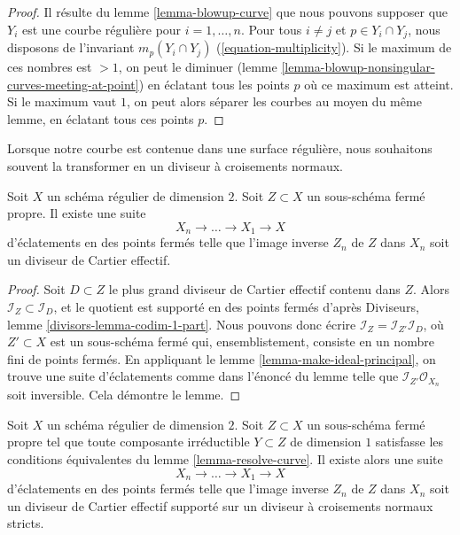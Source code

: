 \begin{proof} Il résulte du lemme \ref{lemma-blowup-curve} que nous pouvons supposer que $Y_i$ est une courbe régulière pour $i = 1, \ldots, n$. Pour tous $i \not = j$ et $p \in Y_i \cap Y_j$, nous disposons de l'invariant $m_p(Y_i \cap Y_j)$ (\ref{equation-multiplicity}). Si le maximum de ces nombres est $> 1$, on peut le diminuer (lemme \ref{lemma-blowup-nonsingular-curves-meeting-at-point}) en éclatant tous les points $p$ où ce maximum est atteint. Si le maximum vaut $1$, on peut alors séparer les courbes au moyen du même lemme, en éclatant tous ces points $p$. \end{proof}

\noindent Lorsque notre courbe est contenue dans une surface régulière, nous souhaitons souvent la transformer en un diviseur à croisements normaux.

\begin{lemma} \label{lemma-turn-into-effective-Cartier} Soit $X$ un schéma régulier de dimension $2$. Soit $Z \subset X$ un sous-schéma fermé propre. Il existe une suite $$
X_n \to \ldots \to X_1 \to X
$$ d'éclatements en des points fermés telle que l'image inverse $Z_n$ de $Z$ dans $X_n$ soit un diviseur de Cartier effectif. \end{lemma}

\begin{proof} Soit $D \subset Z$ le plus grand diviseur de Cartier effectif contenu dans $Z$. Alors $\mathcal{I}_Z \subset \mathcal{I}_D$, et le quotient est supporté en des points fermés d'après Diviseurs, lemme \ref{divisors-lemma-codim-1-part}. Nous pouvons donc écrire $\mathcal{I}_Z = \mathcal{I}_{Z'} \mathcal{I}_D$, où $Z' \subset X$ est un sous-schéma fermé qui, ensemblistement, consiste en un nombre fini de points fermés. En appliquant le lemme \ref{lemma-make-ideal-principal}, on trouve une suite d'éclatements comme dans l'énoncé du lemme telle que $\mathcal{I}_{Z'}\mathcal{O}_{X_n}$ soit inversible. Cela démontre le lemme. \end{proof}

\begin{lemma} \label{lemma-embedded-resolution} Soit $X$ un schéma régulier de dimension $2$. Soit $Z \subset X$ un sous-schéma fermé propre tel que toute composante irréductible $Y \subset Z$ de dimension $1$ satisfasse les conditions équivalentes du lemme \ref{lemma-resolve-curve}. Il existe alors une suite $$
X_n \to \ldots \to X_1 \to X
$$ d'éclatements en des points fermés telle que l'image inverse $Z_n$ de $Z$ dans $X_n$ soit un diviseur de Cartier effectif supporté sur un diviseur à croisements normaux stricts. \end{lemma}

